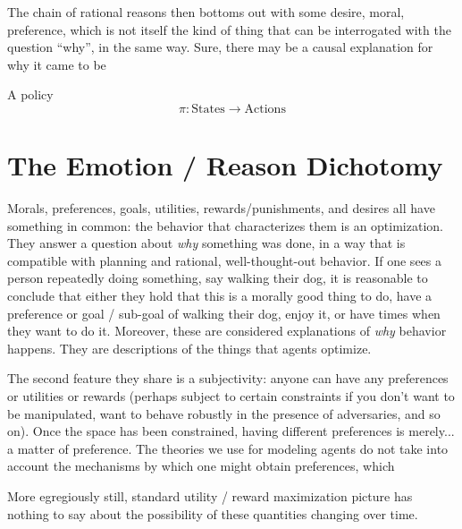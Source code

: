 \documentclass{book}
\begin{document}
	
	
	The chain of rational reasons then bottoms out with some desire, moral, preference, which is not itself the kind of thing that can be interrogated with the question ``why'', in the same way. Sure, there may be a causal explanation for why it came to be
	
	
			
	A policy
	\[ \pi: \mathrm{States} \to \mathrm{Actions} \]
	
	
	
	
	\section{The Emotion / Reason Dichotomy}
	Morals, preferences, goals, utilities, rewards/punishments, and desires all have something in common: the behavior that characterizes them is an optimization. They answer a question about \emph{why} something was done, in a way that is compatible with planning and rational, well-thought-out behavior. If one sees a person repeatedly doing something, say walking their dog, it is reasonable to conclude that either they hold that this is a morally good thing to do, have a preference or goal / sub-goal of walking their dog, enjoy it, or have times when they want to do it. Moreover, these are considered explanations of \emph{why} behavior happens. They are descriptions of the things that agents optimize.
	
	The second feature they share is a subjectivity: anyone can have any preferences or utilities or rewards (perhaps subject to certain constraints if you don't want to be manipulated, want to behave robustly in the presence of adversaries, and so on). Once the space has been constrained, having different preferences is merely... a matter of preference. The theories we use for modeling agents do not take into account the mechanisms by which one might obtain preferences, which 
	
	More egregiously still, standard utility / reward maximization picture has nothing to say about the possibility of these quantities changing over time.
	
\end{document}
